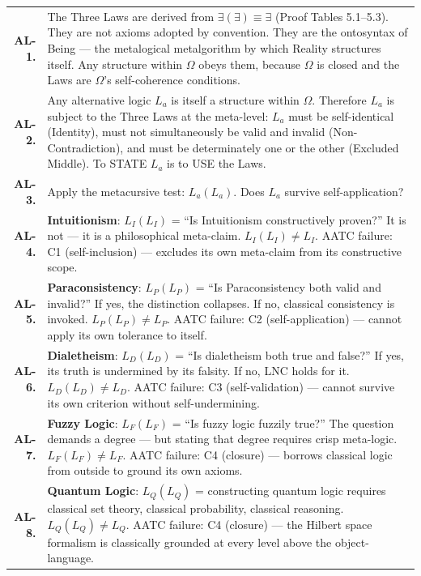 \documentclass[10pt, openany, oneside]{book}
\renewcommand{\footnotesize}{\fontsize{8.5}{11}\selectfont}
\begin{document}
{\footnotesize
\noindent\begin{tabular}{r p{}}
\textbf{AL-1.} & The Three Laws are derived from $\exists(\exists) \equiv \exists$ (Proof Tables 5.1--5.3). They are not axioms adopted by convention. They are the ontosyntax of Being --- the metalogical metalgorithm by which Reality structures itself. Any structure within $\Omega$ obeys them, because $\Omega$ is closed and the Laws are $\Omega$'s self-coherence conditions. \\[0.3em]
\textbf{AL-2.} & Any alternative logic $L_a$ is itself a structure within $\Omega$. Therefore $L_a$ is subject to the Three Laws at the meta-level: $L_a$ must be self-identical (Identity), must not simultaneously be valid and invalid (Non-Contradiction), and must be determinately one or the other (Excluded Middle). To STATE $L_a$ is to USE the Laws. \\[0.3em]
\textbf{AL-3.} & Apply the metacursive test: $L_a(L_a)$. Does $L_a$ survive self-application? \\[0.3em]
\textbf{AL-4.} & \textbf{Intuitionism}: $L_I(L_I)$ = ``Is Intuitionism constructively proven?'' It is not --- it is a philosophical meta-claim. $L_I(L_I) \neq L_I$. AATC failure: C1 (self-inclusion) --- excludes its own meta-claim from its constructive scope. \\[0.3em]
\textbf{AL-5.} & \textbf{Paraconsistency}: $L_P(L_P)$ = ``Is Paraconsistency both valid and invalid?'' If yes, the distinction collapses. If no, classical consistency is invoked. $L_P(L_P) \neq L_P$. AATC failure: C2 (self-application) --- cannot apply its own tolerance to itself. \\[0.3em]
\textbf{AL-6.} & \textbf{Dialetheism}: $L_D(L_D)$ = ``Is dialetheism both true and false?'' If yes, its truth is undermined by its falsity. If no, LNC holds for it. $L_D(L_D) \neq L_D$. AATC failure: C3 (self-validation) --- cannot survive its own criterion without self-undermining. \\[0.3em]
\textbf{AL-7.} & \textbf{Fuzzy Logic}: $L_F(L_F)$ = ``Is fuzzy logic fuzzily true?'' The question demands a degree --- but stating that degree requires crisp meta-logic. $L_F(L_F) \neq L_F$. AATC failure: C4 (closure) --- borrows classical logic from outside to ground its own axioms. \\[0.3em]
\textbf{AL-8.} & \textbf{Quantum Logic}: $L_Q(L_Q)$ = constructing quantum logic requires classical set theory, classical probability, classical reasoning. $L_Q(L_Q) \neq L_Q$. AATC failure: C4 (closure) --- the Hilbert space formalism is classically grounded at every level above the object-language. \\[0.3em]

\end{tabular}}
\end{document}
